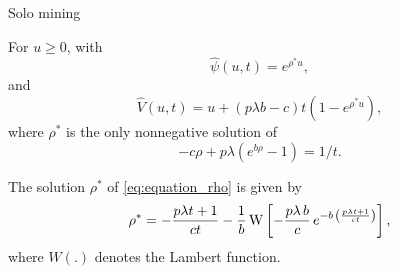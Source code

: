 \documentclass{beamer}
\begin{document}
\begin{frame}{Solo mining}
\scriptsize
\begin{tcolorbox}[enhanced,drop shadow, title=Theorem (profit and ruin when mining solo)]
For $u\geq0$, with 
\begin{equation*}
\widehat{\psi}(u,t) = e^{\rho^\ast u},
\end{equation*}
and 
\begin{equation*}
\widehat{V}(u,t) = u+(p\lambda b-c)t\left(1-e^{\rho^\ast u }\right),
\end{equation*}
where $\rho^\ast$ is the only nonnegative solution of
\begin{equation}\label{eq:equation_rho}
-c\rho + p\lambda(e^{b\rho}-1) = 1/t.
\end{equation}
\end{tcolorbox}
\begin{tcolorbox}[enhanced,drop shadow, title=Lambert function]
The solution $\rho^\ast$ of \eqref{eq:equation_rho} is given by 
\begin{equation*}
  \rho^{\ast}=-\frac{p \lambda t+1}{ct}
  -\frac{1}{b} \,{\rm W} \left[-\frac{p\lambda
    \,b}{c}\,{e^{-b\,\left(\frac{p \lambda t+1}{ct}\right)}}
  \right],
  \end{equation*}
  where $W(.)$ denotes the Lambert function.
\end{tcolorbox}
\end{frame}
\end{document}
